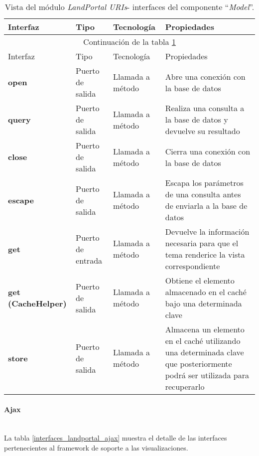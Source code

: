 \begin{longtable}[c]{|p{25mm}|p{20mm}|p{30mm}|p{60mm}|}
	\caption{Vista del módulo \textit{LandPortal URIs}- interfaces del componente ``\textit{Model}''. \label{interfaces_landportal_model}}\\
		\hline
			Interfaz & Tipo & Tecnología & Propiedades\\
		\hline
		\hline
	\endfirsthead
		\hline
		\multicolumn{4}{|c|}{Continuación de la tabla \ref{interfaces_landportal_model}}\\
		\hline
			Interfaz & Tipo & Tecnología & Propiedades\\
		\hline
		\hline
	\endhead
	\hline
	\endfoot
		\textbf{open} & Puerto de salida & Llamada a método & Abre una conexión con la base de datos \\
		\hline
		\textbf{query} & Puerto de salida & Llamada a método & Realiza una consulta a la base de datos y devuelve su resultado \\
		\hline
		\textbf{close} & Puerto de salida & Llamada a método & Cierra una conexión con la base de datos \\
		\hline
		\textbf{escape} & Puerto de salida & Llamada a método & Escapa los parámetros de una consulta antes de enviarla a la base de datos \\
		\hline
		\textbf{get} & Puerto de entrada & Llamada a método & Devuelve la información necesaria para que el tema renderice la vista correspondiente \\
		\hline
		\textbf{get (CacheHelper)} & Puerto de salida & Llamada a método & Obtiene el elemento almacenado en el caché bajo una determinada clave \\
		\hline
		\textbf{store} & Puerto de salida & Llamada a método & Almacena un elemento en el caché utilizando una determinada clave que posteriormente podrá ser utilizada para recuperarlo \\
	\hline
	\hline
\end{longtable}


\paragraph{Ajax} \hfill \\
La tabla \ref{interfaces_landportal_ajax} muestra el detalle de las interfaces pertenecientes al framework de soporte a las visualizaciones.  

